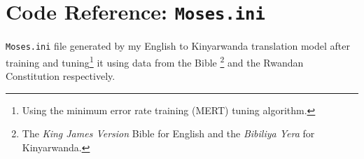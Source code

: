 \chapter{Code Reference: \texttt{Moses.ini}}
\texttt{Moses.ini} file generated by my English to Kinyarwanda translation model after training and tuning\footnote{Using the minimum error rate training (MERT) tuning algorithm.} it using data from the Bible \footnote{The \textit{King James Version} Bible for English and the \textit{Bibiliya Yera} for Kinyarwanda.} and the Rwandan Constitution respectively. \newline




%


%

%
 
